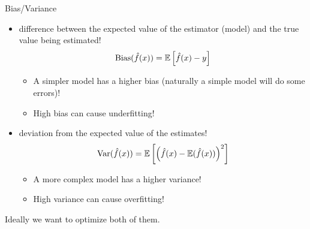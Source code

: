 \documentclass[xcolor={usenames,dvipsnames},handout]{beamer}
\begin{document}
\begin{frame}{Bias/Variance}
\begin{itemize}
\item {} difference between the expected value of the estimator (model) and the true value being estimated!
$$
\text{Bias}(\hat{f}(x)) = \mathbb{E}\left[ \hat{f}(x) - y \right]
$$
\begin{itemize}
\item A simpler model has a higher bias (naturally a simple model will
do some errors)!
\item High bias can cause \alert{underfitting!}
\end{itemize}
\pause
\item {} deviation from the expected value of the estimates!
$$
\text{Var}(\hat{f}(x)) = \mathbb{E}\left[ \left(\hat{f}(x) - \mathbb{E} (\hat{f}(x))\right)^2 \right]
$$
\begin{itemize}
\item A more complex model has a higher variance! 
\item High variance can cause \alert{overfitting!}
\end{itemize}
\end{itemize}
\pause
\begin{exampleblock}{}
Ideally we want to optimize both of them.
\end{exampleblock}
\end{frame}
\end{document}
